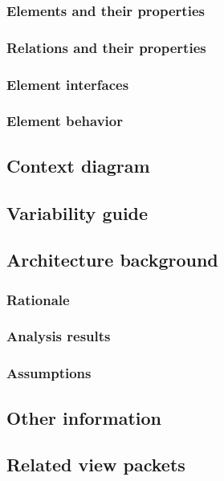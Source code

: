 \documentclass[a4paper,10pt]{report}
\begin{document}
\subsubsection{Elements and their properties}

\subsubsection{Relations and their properties}

\subsubsection{Element interfaces}

\subsubsection{Element behavior}

\subsection{Context diagram}

\subsection{Variability guide}

\subsection{Architecture background}

\subsubsection{Rationale}

\subsubsection{Analysis results}

\subsubsection{Assumptions}

\subsection{Other information}

\subsection{Related view packets}
\end{document}
